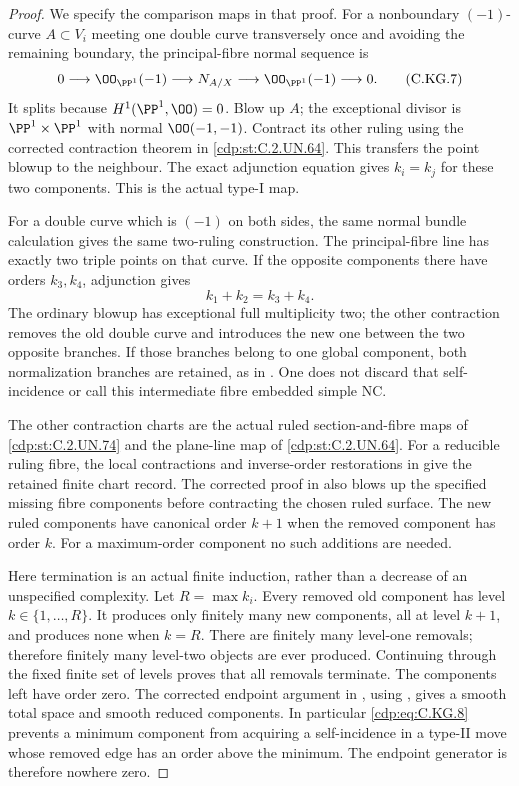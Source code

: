 \begin{proof}
We specify the comparison maps in that proof.
For a nonboundary $(-1)$-curve $A\subset V_i$
meeting one double curve transversely once
and avoiding the remaining boundary, the
principal-fibre normal sequence is
\[
 0\longrightarrow\OO_{\PP^1}(-1)
 \longrightarrow N_{A/X}
 \longrightarrow\OO_{\PP^1}(-1)
 \longrightarrow0.
\tag{C.KG.7}\label{cdp:eq:C.KG.7}
\]
It splits because $H^1(\PP^1,\OO)=0$.
Blow up $A$; the exceptional divisor is
$\PP^1\times\PP^1$ with normal
$\OO(-1,-1)$. Contract its other ruling
using the corrected contraction theorem in
\ref{cdp:st:C.2.UN.64}. This transfers the point blowup to
the neighbour. The exact adjunction equation
gives $k_i=k_j$ for these two components.
This is the actual type-I map.

For a double curve which is $(-1)$ on both
sides, the same normal bundle calculation
gives the same two-ruling construction.
The principal-fibre line has exactly two
triple points on that curve. If the opposite
components there have orders $k_3,k_4$,
adjunction gives
\[
                         k_1+k_2=k_3+k_4.
\tag{C.KG.8}\label{cdp:eq:C.KG.8}
\]
The ordinary blowup has exceptional full
multiplicity two; the other contraction
removes the old double curve and introduces
the new one between the two opposite
branches. If those branches belong to one
global component, both normalization branches
are retained, as in
\cite[\S4.4]{Kulikov1977}. One does not
discard that self-incidence or call this
intermediate fibre embedded simple NC.

The other contraction charts are the actual
ruled section-and-fibre maps of \ref{cdp:st:C.2.UN.74} and
the plane-line map of \ref{cdp:st:C.2.UN.64}. For a reducible
ruling fibre, the local contractions and
inverse-order restorations in
\cite[\S\S4.10.7--4.10.9,4.14.5]{Kulikov1977}
give the retained finite chart record.
The corrected proof in
\cite[\S8]{Kulikov1981} also blows up the
specified missing fibre components before
contracting the chosen ruled surface.
The new ruled components have canonical
order $k+1$ when the removed component has
order $k$. For a maximum-order component
no such additions are needed.

Here termination is an actual finite
induction, rather than a decrease of an
unspecified complexity. Let $R=\max k_i$.
Every removed old component has level
$k\in\{1,\ldots,R\}$. It produces only
finitely many new components, all at level
$k+1$, and produces none when $k=R$.
There are finitely many level-one removals;
therefore finitely many level-two objects
are ever produced. Continuing through the
fixed finite set of levels proves that all
removals terminate. The components left
have order zero. The corrected endpoint
argument in \cite[\S10]{Kulikov1981}, using
\cite[\S4.17]{Kulikov1977}, gives a smooth
total space and smooth reduced components.
In particular \eqref{cdp:eq:C.KG.8} prevents a minimum
component from acquiring a self-incidence
in a type-II move whose removed edge has
an order above the minimum. The endpoint
generator is therefore nowhere zero.


\end{proof}
